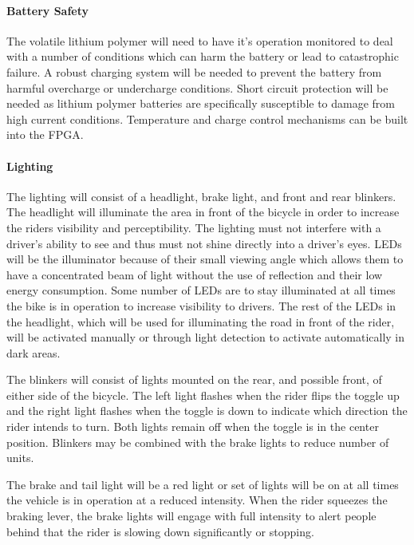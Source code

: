\documentclass[12pt,article]{IEEEtran}
\begin{document}
        \paragraph{\bfseries Battery Safety}
            The volatile lithium polymer will need to have it's operation monitored to deal with a
            number of conditions which can harm the battery or lead to catastrophic failure. A robust
            charging system will be needed to prevent the battery from harmful overcharge or undercharge
            conditions. Short circuit protection will be needed as lithium polymer batteries are specifically
            susceptible to damage from high current conditions. Temperature and charge control mechanisms
            can be built into the FPGA. 

        \paragraph{\bfseries Lighting}
            The lighting will consist of a headlight, brake light, and front and rear blinkers. The 
            headlight will illuminate the area in front of the bicycle in order to increase the riders 
            visibility and perceptibility.  The lighting must not interfere with a driver’s ability to 
            see and thus must not shine directly into a driver’s eyes.  LEDs will be the illuminator 
            because of their small viewing angle which allows them to have a concentrated beam of light 
            without the use of reflection and their low energy consumption.  Some number of LEDs are to
            stay illuminated at all times the bike is in operation to increase visibility to drivers.  
            The rest of the LEDs in the headlight, which will be used for  illuminating the road in 
            front of the rider, will be activated manually or through light detection to activate 
            automatically in dark areas.
        
            The blinkers will consist of lights mounted on the rear, and possible front, of either side of 
            the bicycle.  The left light flashes when the rider flips the toggle up and the right light 
            flashes when the toggle is down to indicate which direction the rider intends to turn.  Both 
            lights remain off when the toggle is in the center position.  Blinkers may be combined with the 
            brake lights to reduce number of  units.
            
            The brake and tail light will be a red light or set of lights will be on at all times the 
            vehicle is in operation at a reduced intensity.  When the rider squeezes the braking lever, 
            the brake lights will engage with full intensity to alert people behind that the rider is 
            slowing down significantly or stopping.
            
\end{document}
